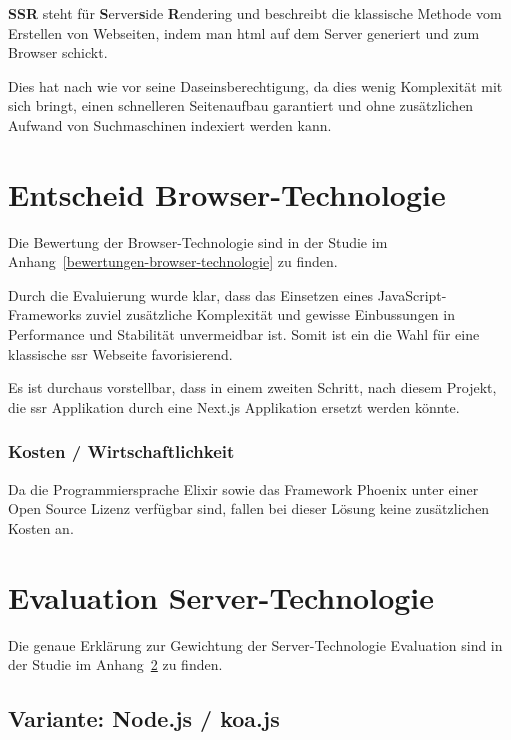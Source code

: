 \textbf{SSR} steht für \textbf{S}erver\textbf{s}ide \textbf{R}endering und
beschreibt die klassische Methode vom Erstellen von Webseiten, indem man \Gls{html}
auf dem Server generiert und zum Browser schickt.

Dies hat nach wie vor seine Daseinsberechtigung, da dies wenig Komplexität
mit sich bringt, einen schnelleren Seitenaufbau garantiert und ohne
zusätzlichen Aufwand von Suchmaschinen indexiert werden kann.

\section{Entscheid Browser-Technologie}\label{entscheid-browser-technologie}

Die Bewertung der Browser-Technologie sind in der Studie im
Anhang~\ref{bewertungen-browser-technologie} zu finden.

Durch die Evaluierung wurde klar, dass das Einsetzen eines JavaScript-Frameworks
zuviel zusätzliche Komplexität und gewisse Einbussungen in Performance und Stabilität
unvermeidbar ist. Somit ist ein die Wahl für eine klassische \Gls{ssr}
Webseite favorisierend.

Es ist durchaus vorstellbar, dass in einem zweiten Schritt, nach diesem Projekt,
die \Gls{ssr} Applikation durch eine Next.js Applikation ersetzt werden
könnte.

\subsubsection{Kosten / Wirtschaftlichkeit}

Da die Programmiersprache Elixir sowie das Framework Phoenix unter einer
Open Source Lizenz verfügbar sind, fallen bei dieser Lösung keine zusätzlichen
Kosten an.

\clearpage
\section{Evaluation Server-Technologie}\label{evaluation-server-technologie}

\noindent{}Die genaue Erklärung zur Gewichtung der Server-Technologie
Evaluation sind in der Studie im Anhang~\ref{evaluation-server-technologie}
zu finden.

\subsection{Variante: Node.js / koa.js}

